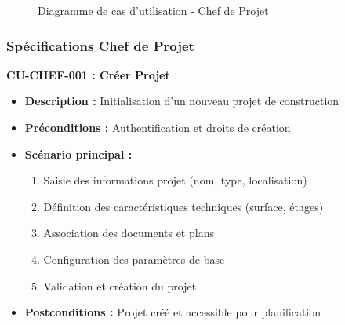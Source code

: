 \begin{figure}[H]
\caption{Diagramme de cas d'utilisation - Chef de Projet}
\label{fig:cas_utilisation_chef}
\end{figure}

\subsubsection{Spécifications Chef de Projet}

\textbf{CU-CHEF-001 : Créer Projet}
\begin{itemize}
    \item \textbf{Description :} Initialisation d'un nouveau projet de construction
    \item \textbf{Préconditions :} Authentification et droits de création
    \item \textbf{Scénario principal :}
    \begin{enumerate}
        \item Saisie des informations projet (nom, type, localisation)
        \item Définition des caractéristiques techniques (surface, étages)
        \item Association des documents et plans
        \item Configuration des paramètres de base
        \item Validation et création du projet
    \end{enumerate}
    \item \textbf{Postconditions :} Projet créé et accessible pour planification
\end{itemize}

